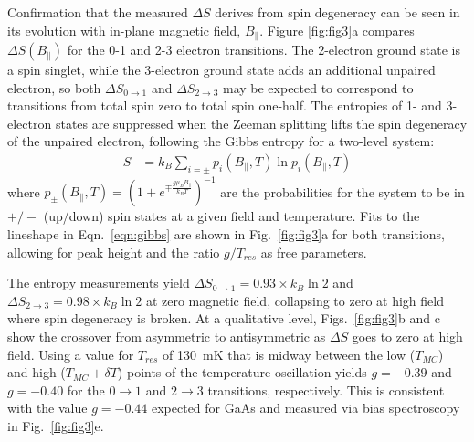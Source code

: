 \documentclass[twocolumn,showpacs,preprintnumbers,amsmath,amssymb,pra,aps,superscriptaddress]{revtex4-1}
\begin{document}
Confirmation that the measured $\Delta S$ derives from spin degeneracy can be seen in its evolution with in-plane magnetic field, $B_\parallel$. Figure \ref{fig:fig3}a compares $\Delta S(B_\parallel)$ for the 0-1 and 2-3 electron transitions.  The 2-electron ground state is a spin singlet, while the 3-electron ground state adds an additional unpaired electron, so both $\Delta S_{0 \rightarrow 1}$ and $\Delta S_{2 \rightarrow 3}$ may be expected to correspond to transitions from total spin zero to total spin one-half.
The entropies of 1- and 3-electron states are suppressed when the Zeeman splitting lifts the spin degeneracy of the unpaired electron, following the Gibbs entropy for a two-level system:
%
\begin{align}
\label{eqn:gibbs}
        S &= k_B \sum_{i=\pm} p_{i}(B_\parallel, T) \ln{ p_{i}(B_\parallel,T) }
\end{align}
%
where $p_{\pm}(B_\parallel, T) = (1+ e^{\mp \frac{g\mu_B B_{\parallel}}{k_B T}})^{-1}$ are the probabilities for the system to be in $+/-$ (up/down) spin states at a given field and temperature. Fits to the lineshape in Eqn.~\ref{eqn:gibbs} are shown in Fig.~\ref{fig:fig3}a for both transitions, allowing for peak height and the ratio $g/T_{res}$ as free parameters.

The entropy measurements yield $\Delta S_{0 \rightarrow 1}=0.93\times k_B \ln{2}$ and $\Delta S_{2 \rightarrow 3}=0.98\times k_B \ln{2}$ at zero magnetic field, collapsing to zero at high field where spin degeneracy is broken.  At a qualitative level, Figs.~\ref{fig:fig3}b and c show the crossover from asymmetric to antisymmetric as $\Delta S$ goes to zero at high field.   Using a value for $T_{res}$ of \SI{130}{\milli\kelvin} that is midway between the low ($T_{MC}$) and high ($T_{MC}+\delta T$) points of the temperature oscillation yields $g=-0.39$ and $g=-0.40$ for the $0\rightarrow 1$ and $2\rightarrow 3$ transitions, respectively. This is consistent with the value $g=-0.44$ expected for GaAs and measured via bias spectroscopy in Fig.~\ref{fig:fig3}e.
\end{document}
